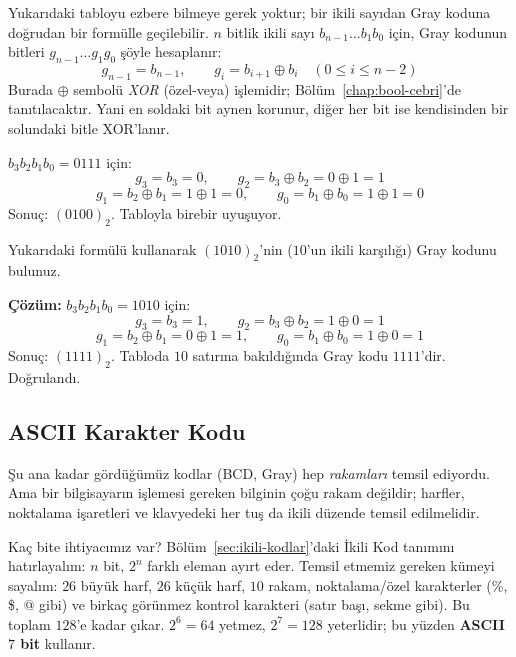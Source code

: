 \begin{bilginot}
Yukarıdaki tabloyu ezbere bilmeye gerek yoktur; bir ikili sayıdan Gray koduna doğrudan bir
formülle geçilebilir. $n$ bitlik ikili sayı $b_{n-1}\ldots b_1b_0$ için, Gray kodunun
bitleri $g_{n-1}\ldots g_1g_0$ şöyle hesaplanır:
\[
g_{n-1}=b_{n-1}, \qquad g_i = b_{i+1}\oplus b_i \quad (0\le i\le n-2)
\]
Burada $\oplus$ sembolü \emph{XOR} (özel-veya) işlemidir; Bölüm~\ref{chap:bool-cebri}'de
tanıtılacaktır. Yani en soldaki bit aynen korunur, diğer her bit ise kendisinden bir
solundaki bitle XOR'lanır.
\end{bilginot}

\begin{ornek}[Formülle $7=(0111)_2$'nin Gray Koduna Çevrilmesi]
$b_3b_2b_1b_0=0111$ için:
\[
g_3=b_3=0,\qquad g_2=b_3\oplus b_2=0\oplus1=1
\]
\[
g_1=b_2\oplus b_1=1\oplus1=0,\qquad g_0=b_1\oplus b_0=1\oplus1=0
\]
Sonuç: $(0100)_2$. Tabloyla birebir uyuşuyor.
\end{ornek}

\begin{alistirma}[\kolay]
Yukarıdaki formülü kullanarak $(1010)_2$'nin ($10$'un ikili karşılığı) Gray kodunu
bulunuz.
\end{alistirma}

\noindent\textbf{Çözüm:} $b_3b_2b_1b_0=1010$ için:
\[
g_3=b_3=1,\qquad g_2=b_3\oplus b_2=1\oplus0=1
\]
\[
g_1=b_2\oplus b_1=0\oplus1=1,\qquad g_0=b_1\oplus b_0=1\oplus0=1
\]
Sonuç: $(1111)_2$. Tabloda $10$ satırına bakıldığında Gray kodu $1111$'dir. Doğrulandı.

\subsection{ASCII Karakter Kodu}
\label{sec:ascii}

Şu ana kadar gördüğümüz kodlar (BCD, Gray) hep \emph{rakamları} temsil ediyordu. Ama bir
bilgisayarın işlemesi gereken bilginin çoğu rakam değildir; harfler, noktalama işaretleri
ve klavyedeki her tuş da ikili düzende temsil edilmelidir.

Kaç bite ihtiyacımız var? Bölüm~\ref{sec:ikili-kodlar}'daki İkili Kod tanımını
hatırlayalım: $n$ bit, $2^n$ farklı eleman ayırt eder. Temsil etmemiz gereken kümeyi
sayalım: $26$ büyük harf, $26$ küçük harf, $10$ rakam, noktalama/özel karakterler
(\%, \$, @ gibi) ve birkaç görünmez kontrol karakteri (satır başı, sekme gibi). Bu toplam
$128$'e kadar çıkar. $2^6=64$ yetmez, $2^7=128$ yeterlidir; bu yüzden \textbf{ASCII $7$
bit} kullanır.

